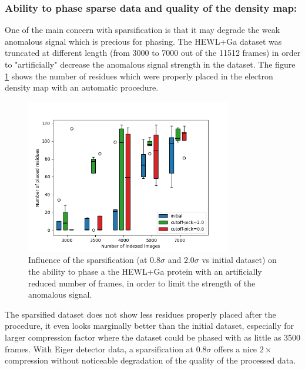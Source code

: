 \documentclass[preprint]{iucr}              %
\begin{document}
\subsubsection{Ability to phase sparse data and quality of the density map:}
One of the main concern with sparsification is that it may degrade the weak anomalous signal which is precious for phasing.
The HEWL+Ga dataset was truncated at different length (from 3000 to 7000 out of the 11512 frames) in order to "artificially" decrease the anomalous signal strength in the dataset.
The figure \ref{nicolas_A} shows the number of residues which were properly placed in the electron density map with an automatic procedure.
\begin{figure}
\label{nicolas_A}
\begin{center}
\includegraphics[width=9cm]{nicolas5.1}
\caption{Influence of the sparsification (at $0.8\sigma$ and $2.0\sigma$ vs initial dataset) on the ability to phase a the HEWL+Ga protein with an artificially reduced number of frames, in order to limit the strength of the anomalous signal.}
\end{center}
\end{figure}

The sparsified dataset does not show less residues properly placed after the procedure, it even looks marginally better than the initial dataset, especially for larger compression factor where the dataset could be phased with as little as 3500 frames. 
With Eiger detector data, a sparsification at $0.8\sigma$ offers a nice $2\times$ compression without noticeable degradation of the quality of the processed data.
\end{document}
